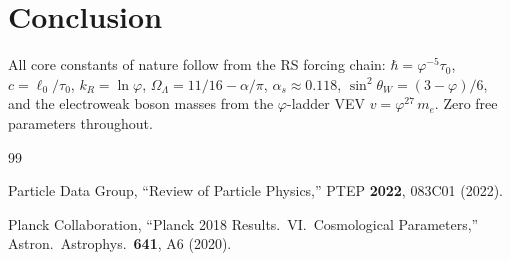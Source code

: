 \documentclass[12pt,a4paper]{article}
\theoremstyle{definition}
\theoremstyle{remark}
\begin{document}
\section{Conclusion}
\label{sec:conclusion}

All core constants of nature follow from the RS forcing chain:
$\hbar = \varphi^{-5}\tau_0$, $c = \ell_0/\tau_0$,
$k_R = \ln\varphi$, $\Omega_\Lambda = 11/16 - \alpha/\pi$,
$\alpha_s \approx 0.118$, $\sin^2\theta_W = (3-\varphi)/6$,
and the electroweak boson masses from the $\varphi$-ladder VEV
$v = \varphi^{27}\,m_e$.  Zero free parameters throughout.

\begin{thebibliography}{99}

Particle Data Group, ``Review of Particle Physics,'' PTEP
\textbf{2022}, 083C01 (2022).

Planck Collaboration, ``Planck 2018 Results.\ VI.\ Cosmological
Parameters,'' Astron.\ Astrophys.\ \textbf{641}, A6 (2020).

\end{thebibliography}
\end{document}
